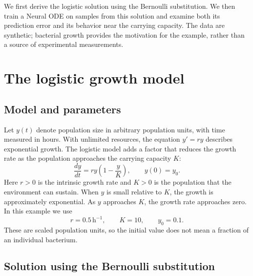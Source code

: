\documentclass[11pt]{article}
\begin{document}
We first derive the logistic solution using the Bernoulli substitution. We then
train a Neural ODE on samples from this solution and examine both its prediction
error and its behavior near the carrying capacity. The data are synthetic;
bacterial growth provides the motivation for the example, rather than a source
of experimental measurements.

\section{The logistic growth model}

\subsection{Model and parameters}

Let $y(t)$ denote population size in arbitrary population units, with time
measured in hours. With unlimited resources, the equation $y'=ry$ describes
exponential growth. The logistic model adds a factor that reduces the growth
rate as the population approaches the carrying capacity $K$:
\begin{equation}
 \frac{dy}{dt}=ry\left(1-\frac{y}{K}\right),\qquad y(0)=y_0.
 \label{eq:logistic}
\end{equation}
Here $r>0$ is the intrinsic growth rate and $K>0$ is the population that the
environment can sustain. When $y$ is small relative to $K$, the growth is
approximately exponential. As $y$ approaches $K$, the growth rate approaches
zero. In this example we use
\[
 r=0.5\,\mathrm{h}^{-1},\qquad K=10,\qquad y_0=0.1.
\]
These are scaled population units, so the initial value does not mean a
fraction of an individual bacterium.

\subsection{Solution using the Bernoulli substitution}
\end{document}
